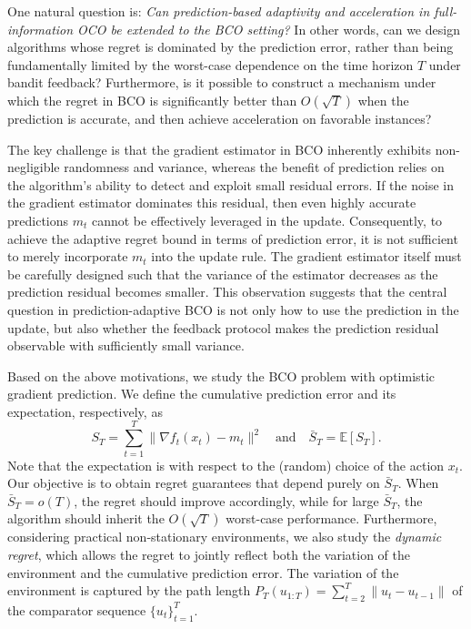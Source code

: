 \documentclass[journal,onecolumn]{IEEEtran}
\theoremstyle{plain}
\theoremstyle{definition}
\theoremstyle{remark}
\begin{document}
One natural question is: \emph{Can prediction-based adaptivity and acceleration in full-information OCO be extended to the BCO setting?} In other words, can we design algorithms whose regret is dominated by the prediction error, rather than being fundamentally limited by the worst-case dependence on the time horizon $T$ under  bandit feedback? Furthermore, is it possible to construct a mechanism under which the regret in BCO is significantly better than $O(\sqrt{T})$ when the prediction is accurate, and then achieve  acceleration on favorable instances?

The key challenge is that the gradient estimator in BCO inherently exhibits non-negligible randomness and variance, whereas the benefit of prediction relies on the algorithm’s ability to detect and exploit small residual errors. If the noise in the gradient estimator dominates  this residual, then even highly accurate predictions $m_t$ cannot be effectively leveraged in the update. Consequently, to achieve the adaptive regret bound in terms of prediction error, it is not sufficient to merely incorporate $m_t$ into the update rule. The gradient estimator itself must be carefully designed such that the variance of the estimator decreases as the prediction residual becomes smaller. This observation suggests that the central question in prediction-adaptive BCO is not only how to use the prediction in the update, but also whether the feedback protocol makes the prediction residual observable with sufficiently small variance.

Based on the above motivations, we study the BCO problem with optimistic gradient prediction. We define the cumulative prediction error and its expectation, respectively, as 
\begin{equation}\label{eq:defst}
    S_T=\sum_{t=1}^T \|\nabla f_t(x_t)-m_t\|^2\quad\mbox{and}\quad \bar S_T=\mathbb{E}[S_T].
\end{equation} 
Note that the expectation is with respect to the (random) choice of the action $x_t$. 
Our   objective is to obtain regret guarantees that depend purely on $\bar S_T$. When $\bar S_T=o(T)$, the regret should improve accordingly, while for large $\bar S_T$, the algorithm should inherit the $O(\sqrt{T})$ worst-case performance. Furthermore, considering   practical non-stationary environments, we also study the \emph{dynamic regret}, which allows the regret to jointly reflect both the variation of the environment and the cumulative prediction error. The  variation of the environment is captured by  the path length $P_T(u_{1:T})=\sum_{t=2}^T \|u_t -u_{t-1}\|$ of the comparator sequence $\{u_t\}_{t=1}^T$. 
\end{document}
